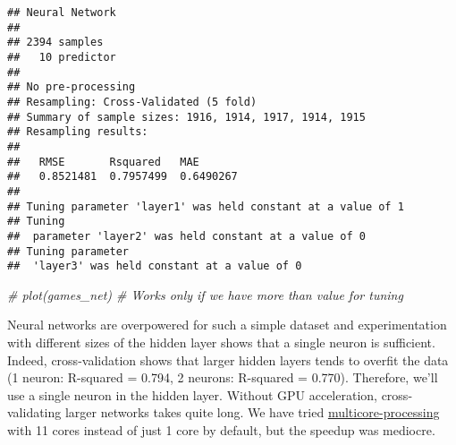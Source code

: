 \documentclass[
]{article}
\newenvironment{Shaded}{\begin{snugshade}}{\end{snugshade}}
\newcommand{\AttributeTok}[1]{\textcolor[rgb]{0.13,0.29,0.53}{#1}}
\newcommand{\CommentTok}[1]{\textcolor[rgb]{0.56,0.35,0.01}{\textit{#1}}}
\newcommand{\DecValTok}[1]{\textcolor[rgb]{0.00,0.00,0.81}{#1}}
\newcommand{\FloatTok}[1]{\textcolor[rgb]{0.00,0.00,0.81}{#1}}
\newcommand{\FunctionTok}[1]{\textcolor[rgb]{0.13,0.29,0.53}{\textbf{#1}}}
\newcommand{\NormalTok}[1]{#1}
\newcommand{\OtherTok}[1]{\textcolor[rgb]{0.56,0.35,0.01}{#1}}
\newcommand{\SpecialCharTok}[1]{\textcolor[rgb]{0.81,0.36,0.00}{\textbf{#1}}}
\newcommand{\StringTok}[1]{\textcolor[rgb]{0.31,0.60,0.02}{#1}}
\begin{document}
\begin{Shaded}
\end{Shaded}

\begin{verbatim}
## Neural Network 
## 
## 2394 samples
##   10 predictor
## 
## No pre-processing
## Resampling: Cross-Validated (5 fold) 
## Summary of sample sizes: 1916, 1914, 1917, 1914, 1915 
## Resampling results:
## 
##   RMSE       Rsquared   MAE      
##   0.8521481  0.7957499  0.6490267
## 
## Tuning parameter 'layer1' was held constant at a value of 1
## Tuning
##  parameter 'layer2' was held constant at a value of 0
## Tuning parameter
##  'layer3' was held constant at a value of 0
\end{verbatim}

\begin{Shaded}
\begin{Highlighting}[]
\CommentTok{\# plot(games\_net) \# Works only if we have more than value for tuning}
\end{Highlighting}
\end{Shaded}

Neural networks are overpowered for such a simple dataset and
experimentation with different sizes of the hidden layer shows that a
single neuron is sufficient. Indeed, cross-validation shows that larger
hidden layers tends to overfit the data (1 neuron: R-squared = 0.794, 2
neurons: R-squared = 0.770). Therefore, we'll use a single neuron in the
hidden layer. Without GPU acceleration, cross-validating larger networks
takes quite long. We have tried
\href{https://topepo.github.io/caret/parallel-processing.html}{multicore-processing}
with 11 cores instead of just 1 core by default, but the speedup was
mediocre.
\end{document}
